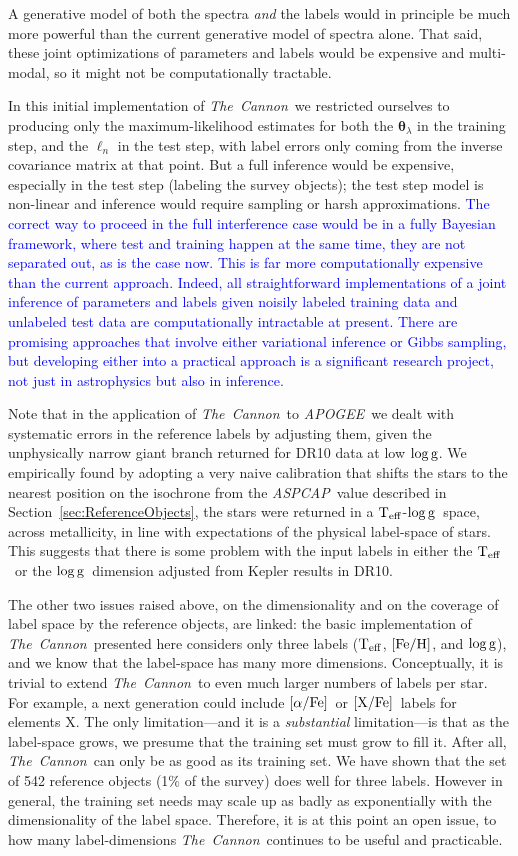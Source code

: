 \documentclass[12pt, preprint]{aastex}
\newcommand{\sectionname}{Section}
\newcommand{\tc}{\textsl{The~Cannon}}
\newcommand{\apogee}{\textsl{APOGEE}}
\newcommand{\aspcap}{\textsl{ASPCAP}}
\newcommand{\set}[1]{\bm{#1}}
\newcommand{\starlabel}{\ell}
\newcommand{\starlabelvec}{\set{\starlabel}}
\newcommand{\teff}{\mbox{$\rm T_{eff}$}}
\newcommand{\feh}{\mbox{$\rm [Fe/H]$}}
\newcommand{\xfe}{\mbox{$\rm [X/Fe]$}}
\newcommand{\alphafe}{\mbox{$\rm [\alpha/Fe]$}}
\newcommand{\logg}{\mbox{$\rm \log g$}}
\begin{document}
A generative model of both the spectra \emph{and} the labels
would in principle be much more powerful than the current generative
model of spectra alone.
That said, these joint optimizations of parameters and labels would be
expensive and multi-modal, so it might not be computationally
tractable.

In this initial implementation of \tc\ we restricted ourselves to producing only the maximum-likelihood estimates for both the $\set{\theta}_\lambda$ in the training step, and the $\starlabelvec_n$
in the test step, with label errors only coming from the inverse covariance matrix at that point.
But a full inference would be expensive, especially in the test step
(labeling the survey objects); the test step model is non-linear and
inference would require sampling or harsh approximations.
 \textcolor{blue}{The correct way to proceed in the full interference case would be in a fully Bayesian framework, where test and training happen at the same time, they are not separated out, as is the case now. 
This is far more computationally expensive than the current approach. Indeed, all straightforward implementations of a joint inference of parameters and labels given noisily labeled training data and unlabeled test data are computationally intractable at present.  There are promising approaches that involve either variational inference or Gibbs sampling, but developing either into a practical approach is a significant research project, not just in astrophysics but also in inference.}


Note that in the application of \tc\ to \apogee\ we dealt with systematic errors in the reference
labels by adjusting them,  given the unphysically narrow giant branch returned for DR10 data at low \logg.  We empirically found by adopting a very naive calibration that shifts the stars to the nearest position on the isochrone from the \aspcap\ value described in \sectionname~\ref{sec:ReferenceObjects}, the stars were returned in a \teff-\logg\ space, across metallicity, in line with expectations of the physical label-space of stars. This suggests that there is some problem with the input labels in either the \teff\ or the \logg\ dimension adjusted from Kepler results in DR10. 

The other two issues raised above, on the dimensionality and on the coverage of label space by the reference objects, are linked: 
the basic implementation of \tc\ presented here considers only three
labels (\teff, \feh, and \logg), and we know that the label-space has many more dimensions.
Conceptually, it is trivial to extend \tc\ to even much larger numbers of labels per star. 
For example, a next generation could include \alphafe\ or \xfe\
labels for elements X.
The only limitation---and it is a \emph{substantial} limitation---is
that as the label-space grows, we presume that the training set must grow to fill it.
After all, \tc\ can only be as good as its training set.
We have shown that the set of 542 reference objects (1$\%$ of the survey) does well for three labels. However in general, the training set needs may scale up as badly as exponentially
with the dimensionality of the label space. Therefore, it is at this point an open issue, to 
how many label-dimensions \tc\ continues to be useful and practicable. 
\end{document}
